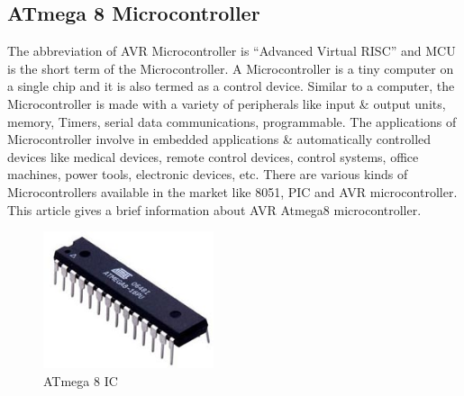 \documentclass[twoside,a4paper,16pt]{book}
\begin{document}
{\subsection{ATmega 8 Microcontroller }
The abbreviation of AVR Microcontroller is “Advanced Virtual RISC” and MCU is the short term of the Microcontroller. A Microcontroller is a tiny computer on a single chip and it is also termed as a control device. Similar to a computer, the Microcontroller is made with a variety of peripherals like input \& output units, memory, Timers, serial data communications, programmable. The applications of Microcontroller involve in embedded applications \& automatically controlled devices like medical devices, remote control devices, control systems, office machines, power tools, electronic devices, etc. There are various kinds of Microcontrollers available in the market like 8051, PIC and AVR microcontroller. This article gives a brief information about AVR Atmega8 microcontroller.
\begin{figure}[ht!]
	\begin{center}
		\includegraphics[width=5.0cm]{8.jpg}
		\caption{ATmega 8 IC}
	\end{center}
\end{figure}
}
\end{document}
